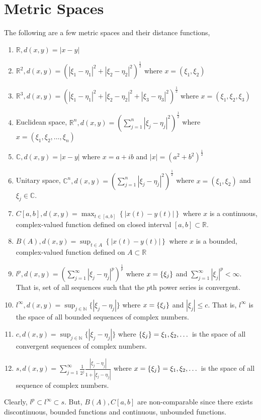 \section{Metric Spaces}
The following are a few metric spaces and their distance functions,
\begin{enumerate}
	\item $\mathbb{R}, d(x,y) = |x -y|$
	\item $\mathbb{R}^2, d(x,y) = \left( |\xi_1-\eta_1|^2 + |\xi_2 - \eta_2|^2 \right)^\frac{1}{2} $ where $x = (\xi_1,\xi_2)$
	\item $\mathbb{R}^3, d(x,y) = \left( |\xi_1-\eta_1|^2 + |\xi_2 - \eta_2|^2 + |\xi_3-\eta_3|^2 \right)^\frac{1}{2} $ where $x = (\xi_1,\xi_2,\xi_3)$
	\item Euclidean space, $\displaystyle \mathbb{R}^n, d(x,y) = \left( \sum_{j=1}^n |\xi_j - \eta_j|^2 \right)^\frac{1}{2}$ where $x = (\xi_1,\xi_2,\dots,\xi_n)$
	\item $\mathbb{C}, d(x,y) = |x - y|$ where $x = a+ib$ and $|x| = (a^2+b^2)^\frac{1}{2}$
	\item Unitary space, $\displaystyle \mathbb{C}^n, d(x,y) =  \left( \sum_{j=1}^n |\xi_j - \eta_j|^2 \right)^\frac{1}{2}$ where  $x = (\xi_1,\xi_2)$ and $\xi_j \in \mathbb{C}$.
	\item $\displaystyle C[a,b], d(x,y) = \max_{t \in [a,b]} \left\{ |x(t)-y(t)| \right\}$ where $x$ is a continuous, complex-valued function defined on closed interval $[a,b] \subset \mathbb{R}$.
	\item $\displaystyle B(A), d(x,y) = \sup_{t \in A} \left\{ |x(t)-y(t)| \right\}$ where $x$ is a bounded, complex-valued function defined on $A \subset \mathbb{R}$
	\item $\displaystyle l^p, d(x,y) = \left( \sum_{j = 1}^\infty |\xi_j - \eta_j|^p \right)^\frac{1}{p}$ where $x = \left\{\xi_j\right\}$ and $\displaystyle \sum_{j=1}^\infty |\xi_j|^p < \infty$. That is, set of all sequences such that the $p$th power series is convergent.
	\item $\displaystyle l^\infty, d(x,y) = \sup_{j \in \mathbb{N}} \{ |\xi_j - \eta_j| \} $ where $x = \left\{\xi_j\right\}$ and $|\xi_j| \le c$. That is, $l^\infty$ is the space of all bounded sequences of complex numbers.
	\item $\displaystyle c, d(x,y) = \sup_{j \in \mathbb{N}} \{ |\xi_j - \eta_j| \}$ where $\left\{\xi_j\right\} = \xi_1,\xi_2,\dotsc$ is the space of all convergent sequences of complex numbers.
	\item $\displaystyle s, d(x,y) = \sum_{j = 1}^\infty \frac{1}{2^j} \frac{|\xi_j - \eta_j|}{1+|\xi_j-\eta_j|}$ where $x = \left\{\xi_j\right\} = \xi_1,\xi_2,\dotsc$ is the space of all sequence of complex numbers.
\end{enumerate}
Clearly, $l^p \subset l^\infty \subset s$.
But, $B(A),C[a,b]$ are non-comparable since there exists discontinuous, bounded functions and continuous, unbounded functions.

